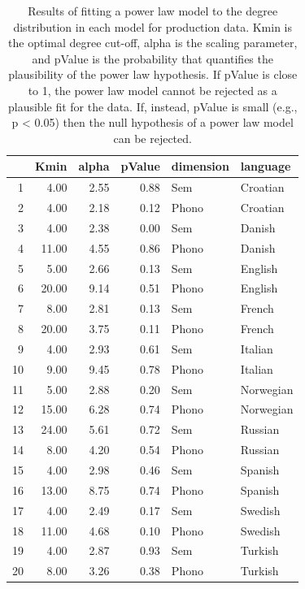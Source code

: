 \documentclass[english,floatsintext,man]{apa6}
\theoremstyle{definition}
\theoremstyle{definition}
\theoremstyle{definition}
\theoremstyle{remark}
\begin{document}
\begin{table}[H]
\centering
\begin{tabular}{rrrrll}
  \hline
 & Kmin & alpha & pValue & dimension & language \\ 
  \hline
1 & 4.00 & 2.55 & 0.88 & Sem & Croatian \\ 
  2 & 4.00 & 2.18 & 0.12 & Phono & Croatian \\ 
  3 & 4.00 & 2.38 & 0.00 & Sem & Danish \\ 
  4 & 11.00 & 4.55 & 0.86 & Phono & Danish \\ 
  5 & 5.00 & 2.66 & 0.13 & Sem & English \\ 
  6 & 20.00 & 9.14 & 0.51 & Phono & English \\ 
  7 & 8.00 & 2.81 & 0.13 & Sem & French \\ 
  8 & 20.00 & 3.75 & 0.11 & Phono & French \\ 
  9 & 4.00 & 2.93 & 0.61 & Sem & Italian \\ 
  10 & 9.00 & 9.45 & 0.78 & Phono & Italian \\ 
  11 & 5.00 & 2.88 & 0.20 & Sem & Norwegian \\ 
  12 & 15.00 & 6.28 & 0.74 & Phono & Norwegian \\ 
  13 & 24.00 & 5.61 & 0.72 & Sem & Russian \\ 
  14 & 8.00 & 4.20 & 0.54 & Phono & Russian \\ 
  15 & 4.00 & 2.98 & 0.46 & Sem & Spanish \\ 
  16 & 13.00 & 8.75 & 0.74 & Phono & Spanish \\ 
  17 & 4.00 & 2.49 & 0.17 & Sem & Swedish \\ 
  18 & 11.00 & 4.68 & 0.10 & Phono & Swedish \\ 
  19 & 4.00 & 2.87 & 0.93 & Sem & Turkish \\ 
  20 & 8.00 & 3.26 & 0.38 & Phono & Turkish \\ 
   \hline
\end{tabular}
\caption{Results of fitting a power law model to the degree distribution in each model for production data. Kmin is the optimal degree cut-off, alpha is the scaling parameter, and pValue is the probability that quantifies the plausibility of the power law hypothesis. If pValue is close to 1, the power law model cannot be rejected as a plausible fit for the data. If, instead, pValue is small (e.g., p < 0.05) then the null hypothesis of a power law model can be rejected.} 
\end{table}\begin{table}[H]

\end{table}
\end{document}

